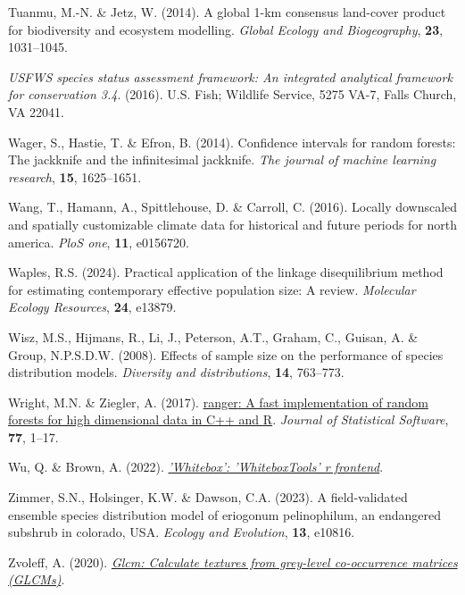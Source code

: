 \documentclass[
]{article}
\newlength{\cslhangindent}
\newenvironment{CSLReferences}[2] %
 {\begin{list}{}{%
  \setlength{\itemindent}{0pt}
  \setlength{\leftmargin}{0pt}
  \setlength{\parsep}{0pt}
  \ifodd #1
   \setlength{\leftmargin}{\cslhangindent}
   \setlength{\itemindent}{-1\cslhangindent}
  \fi
  \setlength{\itemsep}{#2\baselineskip}}}
 {\end{list}}
\begin{document}
\begin{CSLReferences}{1}{1}
Tuanmu, M.-N. \& Jetz, W. (2014). A global 1-km consensus land-cover
product for biodiversity and ecosystem modelling. \emph{Global Ecology
and Biogeography}, \textbf{23}, 1031--1045.

\emph{USFWS species status assessment framework: An integrated
analytical framework for conservation 3.4}. (2016). U.S. Fish; Wildlife
Service, 5275 VA-7, Falls Church, VA 22041.

Wager, S., Hastie, T. \& Efron, B. (2014). Confidence intervals for
random forests: The jackknife and the infinitesimal jackknife. \emph{The
journal of machine learning research}, \textbf{15}, 1625--1651.

Wang, T., Hamann, A., Spittlehouse, D. \& Carroll, C. (2016). Locally
downscaled and spatially customizable climate data for historical and
future periods for north america. \emph{PloS one}, \textbf{11},
e0156720.

Waples, R.S. (2024). Practical application of the linkage disequilibrium
method for estimating contemporary effective population size: A review.
\emph{Molecular Ecology Resources}, \textbf{24}, e13879.

Wisz, M.S., Hijmans, R., Li, J., Peterson, A.T., Graham, C., Guisan, A.
\& Group, N.P.S.D.W. (2008). Effects of sample size on the performance
of species distribution models. \emph{Diversity and distributions},
\textbf{14}, 763--773.

Wright, M.N. \& Ziegler, A. (2017).
\href{https://doi.org/10.18637/jss.v077.i01}{{ranger}: A fast
implementation of random forests for high dimensional data in {C++} and
{R}}. \emph{Journal of Statistical Software}, \textbf{77}, 1--17.

Wu, Q. \& Brown, A. (2022).
\emph{\href{https://CRAN.R-project.org/package=whitebox}{'Whitebox':
'WhiteboxTools' r frontend}}.

Zimmer, S.N., Holsinger, K.W. \& Dawson, C.A. (2023). A field-validated
ensemble species distribution model of eriogonum pelinophilum, an
endangered subshrub in colorado, USA. \emph{Ecology and Evolution},
\textbf{13}, e10816.

Zvoleff, A. (2020).
\emph{\href{https://CRAN.R-project.org/package=glcm}{Glcm: Calculate
textures from grey-level co-occurrence matrices (GLCMs)}}.

\end{CSLReferences}
\end{document}
